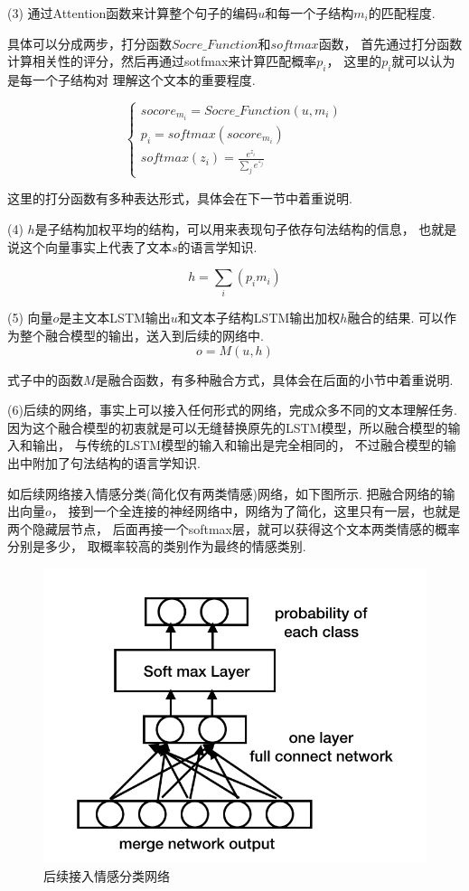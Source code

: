 \documentclass[bachelor,adobefonts]{jnuthesis}
\begin{document}
(3)
通过Attention函数来计算整个句子的编码$u$和每一个子结构$m_{i}$的匹配程度.

具体可以分成两步，打分函数$Socre\_Function$和$softmax$函数，
首先通过打分函数计算相关性的评分，然后再通过sotfmax来计算匹配概率$p_{i}$，
这里的$p_{i}$就可以认为是每一个子结构对
理解这个文本的重要程度.

\begin{equation}
  \left\{
    \begin{array}{l}
     socore_{m_{i}} = Socre\_Function(u,m_{i}) \\ 
     p_{i} = softmax(socore_{m_{i}}) \\ 
     softmax(z_{i}) = \frac{e^{z_{i}}}{\sum_{j} e^{z_{j}}}
    \end{array}
  \right.
\end{equation}

这里的打分函数有多种表达形式，具体会在下一节中着重说明.

(4)
$h$是子结构加权平均的结构，可以用来表现句子依存句法结构的信息，
也就是说这个向量事实上代表了文本$s$的语言学知识.

\begin{equation}
  h = \sum_{i}(p_{i}m_{i})
\end{equation}

(5)
向量$o$是主文本LSTM输出$u$和文本子结构LSTM输出加权$h$融合的结果.
可以作为整个融合模型的输出，送入到后续的网络中.
\begin{equation}
  o = M(u,h)
\end{equation}

式子中的函数$M$是融合函数，有多种融合方式，具体会在后面的小节中着重说明.

(6)后续的网络，事实上可以接入任何形式的网络，完成众多不同的文本理解任务.
因为这个融合模型的初衷就是可以无缝替换原先的LSTM模型，所以融合模型的输入和输出，
与传统的LSTM模型的输入和输出是完全相同的，
不过融合模型的输出中附加了句法结构的语言学知识.

如后续网络接入情感分类(简化仅有两类情感)网络，如下图所示.
把融合网络的输出向量$o$，
接到一个全连接的神经网络中，网络为了简化，这里只有一层，也就是两个隐藏层节点，
后面再接一个softmax层，就可以获得这个文本两类情感的概率分别是多少，
取概率较高的类别作为最终的情感类别.
\begin{figure}[h!]
  \centering
  \includegraphics[width=0.5\linewidth]{二分类.png}
  \caption{后续接入情感分类网络}
\end{figure}
\end{document}
